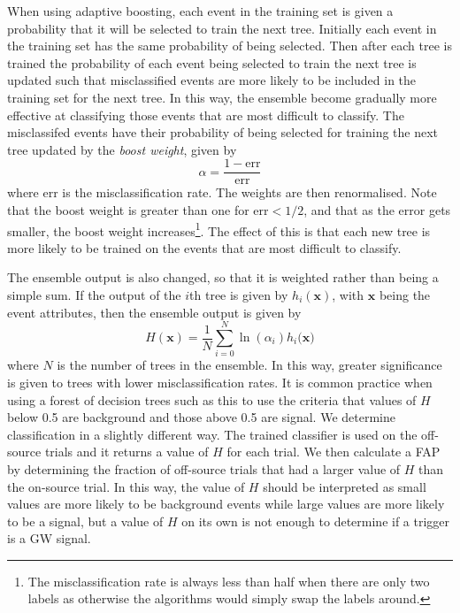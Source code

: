 \documentclass[11pt]{cuthesis}
\begin{document}
When using adaptive boosting, each event in the training set is given a probability that it will be selected to train the next tree. Initially each event in the training set has the same probability of being selected. Then after each tree is trained the probability of each event being selected to train the next tree is updated such that misclassified events are more likely to be included in the training set for the next tree. In this way, the ensemble become gradually more effective at classifying those events that are most difficult to classify. The misclassifed events have their probability of being selected for training the next tree updated by the \textit{boost weight}, given by
\begin{equation}
\alpha = \frac{1 - \text{err}}{\text{err}} 
\end{equation}
where err is the misclassification rate. The weights are then renormalised. Note that the boost weight is greater than one for err$<1/2$, and that as the error gets smaller, the boost weight increases\footnote{The misclassification rate is always less than half when there are only two labels as otherwise the algorithms would simply swap the labels around.}. The effect of this is that each new tree is more likely to be trained on the events that are most difficult to classify. 

The ensemble output is also changed, so that it is weighted rather than being a simple sum. If the output of the $i$th tree is given by $h_i(\textbf{x})$, with $\textbf{x}$ being the event attributes, then the ensemble output is given by
\begin{equation}
H(\textbf{x}) = \frac{1}{N}\sum_{i=0}^N \ln(\alpha_i)h_i(\textbf{x)}
\end{equation}  
where $N$ is the number of trees in the ensemble. In this way, greater significance is given to trees with lower misclassification rates. It is common practice when using a forest of decision trees such as this to use the criteria that values of $H$ below 0.5 are background and those above 0.5 are signal. We determine classification in a slightly different way. The trained classifier is used on the off-source trials and it returns a value of $H$ for each trial. We then calculate a FAP by determining the fraction of off-source trials that had a larger value of $H$ than the on-source trial. In this way, the value of $H$ should be interpreted as small values are more likely to be background events while large values are more likely to be a signal, but a value of $H$ on its own is not enough to determine if a trigger is a GW signal. 
\end{document}
